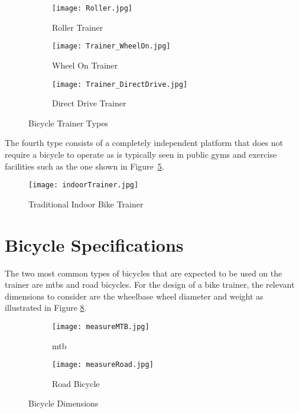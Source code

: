 \begin{figure}[H]
	\centering
	\begin{subfigure}{.3\textwidth}
		\centering
		\texttt{[image: Roller.jpg]}
		\caption{Roller Trainer}
		\label{fig:roller}
	\end{subfigure}
	\hfill
	\begin{subfigure}{.3\textwidth}
		\centering
		\texttt{[image: Trainer\_WheelOn.jpg]}
		\caption{Wheel On Trainer}
		\label{fig:wheelon}
	\end{subfigure}
	\hfill
	\begin{subfigure}{.3\textwidth}
		\centering
		\texttt{[image: Trainer\_DirectDrive.jpg]}
		\caption{Direct Drive Trainer}
		\label{fig:directdrive}
	\end{subfigure}
	\caption{Bicycle Trainer Types}
	\label{fig:trainers}
	\citep[2022]{Zwift:2022}
\end{figure}

\vspace*{-0.5cm}

The fourth type consists of a completely independent platform that does not require a bicycle to operate as is typically seen in public gyms and exercise facilities such as the one shown in Figure~\ref{fig:bike}.

\begin{figure}[H]
	\centering
	\texttt{[image: indoorTrainer.jpg]}
	\caption{Traditional Indoor Bike Trainer}
	\label{fig:bike}
	\citep[2022]{Alibaba:2022}
\end{figure}

\vspace*{-0.5cm}

\section{Bicycle Specifications}
\label{sec:specs}

The two most common types of bicycles that are expected to be used on the trainer are \acp{mtb} and road bicycles. For the design of a bike trainer, the relevant dimensions to consider are the wheelbase wheel diameter and weight as illustrated in Figure \ref{fig:bikeDim}.

\begin{figure}[H]
	\centering
	\begin{subfigure}{.5\textwidth}
		\centering
		\texttt{[image: measureMTB.jpg]}
		\caption{\ac{mtb} \citep{Pratama:2021}}
		\label{fig:sub1}
	\end{subfigure}%
	\begin{subfigure}{.5\textwidth}
		\centering
		\texttt{[image: measureRoad.jpg]}
		\caption{Road Bicycle \citep{Morozev:2017}}
		\label{fig:sub2}
	\end{subfigure}
	\caption{Bicycle Dimensions}
	\label{fig:bikeDim}
\end{figure}

